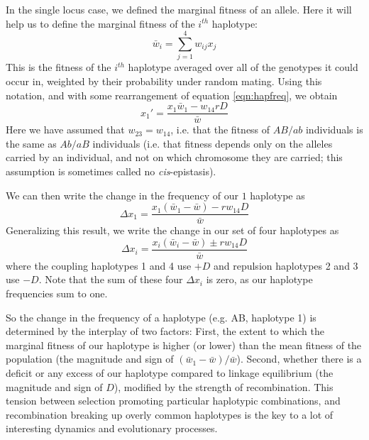 In the single locus case, we defined the marginal fitness of an allele. Here it will help us to define the marginal fitness of the $i^{th}$ haplotype:
\begin{equation}
\bar{w}_i = \sum_{j=1}^4 w_{ij} x_j
\end{equation}
This is the fitness of the $i^{th}$ haplotype averaged over all of the  genotypes it could occur in, weighted by their probability under random mating. Using this notation, and with some rearrangement of equation \eqref{eqn:hapfreq}, we obtain
\begin{equation}
x_1' = \frac{x_1\bar{w}_1 - w_{14} r D}{\bar{w}}
\end{equation}
Here we have assumed that $w_{23}=w_{14}$, i.e. that the fitness of $AB/ab$ individuals is the same as $Ab/aB$ individuals (i.e. that fitness depends only on the alleles carried by an individual, and not on which chromosome they are carried; this assumption is sometimes called no {\it cis}-epistasis). 

We can then write the change in the frequency of our $1$ haplotype as 
\begin{equation}
\Delta x_1= \frac{x_1(\bar{w}_1-\bar{w}) -r w_{14} D}{\bar{w}}
\end{equation}
Generalizing this result, we write the change in  our set of four haplotypes as
\begin{equation}
\Delta x_i= \frac{x_i(\bar{w}_i-\bar{w}) \pm r w_{14} D}{\bar{w}}
\end{equation}
where the coupling haplotypes 1 and 4 use $+D$ and repulsion haplotypes 2 and 3 use $-D$.  Note that the sum of these four $\Delta x_i$ is zero, as our haplotype frequencies sum to one.

So the change in the frequency of a haplotype (e.g. AB, haplotype 1) is determined by the interplay of two factors: First, the extent to which  the marginal fitness of our haplotype is higher (or lower) than the mean fitness of the population (the magnitude and sign of $(\bar{w}_1-\bar{w})/\bar{w}$). Second, whether there is a deficit or any excess of our haplotype compared to linkage equilibrium (the magnitude and sign of $D$), modified by the strength of recombination. This tension between selection promoting particular haplotypic combinations, and recombination breaking up overly common haplotypes is the key to a lot of interesting dynamics and evolutionary processes.

